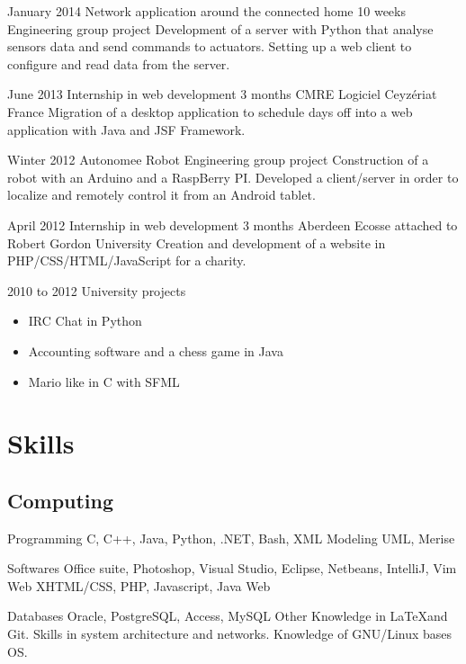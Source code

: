 \documentclass[10pt,a4paper]{moderncv}
\begin{document}
\cventry
	{January 2014}
	{Network application around the connected home}
	{10 weeks}
	{}
	{Engineering group project}
	{Development of a server with Python that analyse sensors data and send commands to actuators. Setting up a web client to configure and read data from the server.}

\cventry
	{June 2013}
	{Internship in web development}
	{3 months}
	{CMRE Logiciel}
	{Ceyzériat France}
	{Migration of a desktop application to schedule days off into a web application with Java and JSF Framework.}

\cventry
	{Winter 2012}
	{Autonomee Robot}
	{}
	{}
	{Engineering group project}
	{Construction of a robot with an Arduino and a RaspBerry PI. Developed a client/server in order to localize and remotely control it from an Android tablet.}

\cventry
	{April 2012}
	{Internship in web development}
	{3 months}
	{Aberdeen Ecosse}
	{attached to Robert Gordon University}
	{Creation and development of a website in PHP/CSS/HTML/JavaScript for a charity.}

\cventry
	{2010 to 2012}
	{University projects}
	{}
	{}
	{}
	{
		\begin{itemize}
			\item IRC Chat in Python
			\item Accounting software and a chess game in Java
			\item Mario like in C with SFML
		\end{itemize}
	}


\section{Skills}

\subsection{Computing}

\cvcomputer
	{Programming}
	{C, C++, Java, Python, .NET, Bash, XML}
	{Modeling}
	{UML, Merise}

\cvcomputer
	{Softwares}
	{Office suite, Photoshop, Visual Studio, Eclipse, Netbeans, IntelliJ, Vim}
	{Web}
	{XHTML/CSS, PHP, Javascript, Java Web}

\cvcomputer
	{Databases}
	{Oracle, PostgreSQL, Access, MySQL}
	{Other}
	{Knowledge in \LaTeX and Git. Skills in system architecture and networks. Knowledge of GNU/Linux bases OS.}
\end{document}
